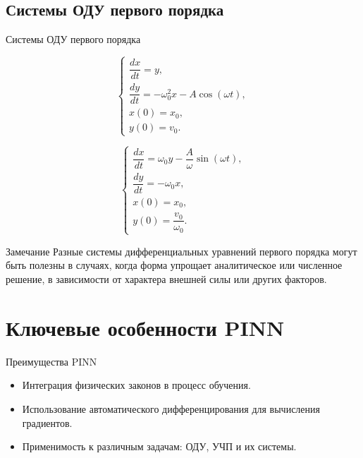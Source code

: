 \documentclass{beamer}
\begin{document}
\subsection{Системы ОДУ первого порядка}
\begin{frame}{Системы ОДУ первого порядка}
    \begin{minipage}[t]{0.45\textwidth}
        \begin{equation}
            \begin{cases}
            \dfrac{dx}{dt} = y, \\
            \dfrac{dy}{dt} = -\omega_0^2 x - A\cos(\omega t), \\
            x(0) = x_0, \\
            y(0) = v_0.
            \end{cases}
        \end{equation}
        \vspace{0.5cm}
    \end{minipage}
    \begin{minipage}[t]{0.45\textwidth}
        \begin{equation}
            \begin{cases}
            \dfrac{dx}{dt} = \omega_0 y - \dfrac{A}{\omega}\sin(\omega t), \\
            \dfrac{dy}{dt} = -\omega_0 x, \\
            x(0) = x_0, \\
            y(0) = \dfrac{v_0}{\omega_0}.
            \end{cases}
        \end{equation}
    \end{minipage}

    \begin{block}{Замечание}
        Разные системы дифференциальных уравнений первого порядка могут быть полезны в случаях, когда форма упрощает аналитическое или численное решение, в зависимости от характера внешней силы или других факторов.
    \end{block}

\end{frame}

\section{Ключевые особенности PINN}
\begin{frame}{Преимущества PINN}
    \begin{itemize}
        \item Интеграция физических законов в процесс обучения.
        \item Использование автоматического дифференцирования для вычисления градиентов.
        \item Применимость к различным задачам: ОДУ, УЧП и их системы.
    \end{itemize}
\end{frame}
\end{document}
